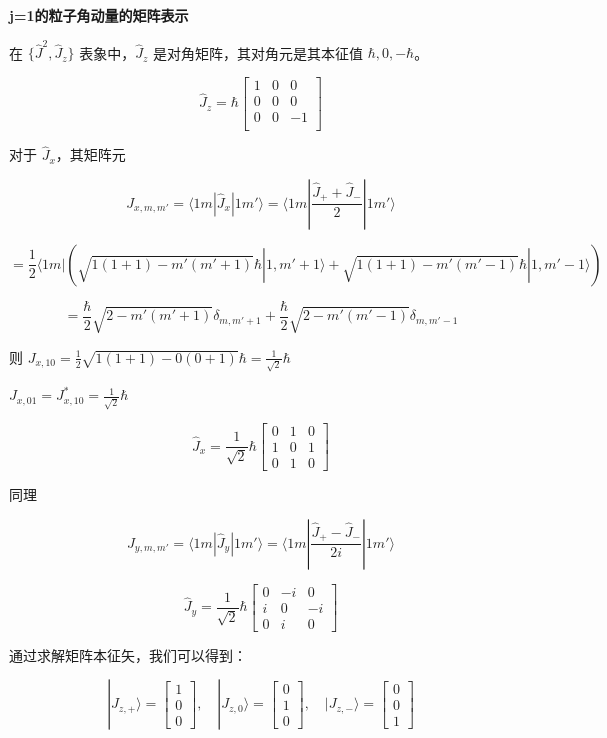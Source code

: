 \documentclass[lang=cn,10pt]{elegantbook}
\begin{document}
\textbf{j=1的粒子角动量的矩阵表示}

在 \(\{\hat{J}^2, \hat{J}_z\}\) 表象中，\(\hat{J}_z\) 是对角矩阵，其对角元是其本征值 \(\hbar, 0, -\hbar\)。

\[
\hat{J}_z = \hbar \begin{bmatrix}
1 & 0 & 0 \\
0 & 0 & 0 \\
0 & 0 & -1 \\
\end{bmatrix}
\]

对于 \(\hat{J}_x\)，其矩阵元

\[
J_{x, m, m'} = \langle 1 m | \hat{J}_x | 1 m' \rangle = \langle 1 m | \frac{\hat{J}_+ + \hat{J}_-}{2} | 1 m' \rangle
\]

\[
= \frac{1}{2} \langle 1 m | (\sqrt{1(1+1) - m'(m'+1)} \hbar | 1,m'+1 \rangle + \sqrt{1(1+1) - m'(m'-1)} \hbar | 1,m'-1 \rangle)
\]

\[
= \frac{\hbar}{2} \sqrt{2 - m'(m'+1)} \delta_{m, m'+1} + \frac{\hbar}{2} \sqrt{2 - m'(m'-1)} \delta_{m, m'-1}
\]

则 \(J_{x,10} = \frac{1}{2} \sqrt{1(1+1) - 0(0+1)} \hbar = \frac{1}{\sqrt{2}} \hbar\)

\(J_{x, 01} = J_{x, 10}^* = \frac{1}{\sqrt{2}} \hbar\)

\[
\hat{J}_x = \frac{1}{\sqrt{2}} \hbar \begin{bmatrix}
0 & 1 & 0 \\
1 & 0 & 1 \\
0 & 1 & 0
\end{bmatrix}
\]

同理

\[
J_{y, m, m'} = \langle 1 m | \hat{J}_y | 1 m' \rangle = \langle 1 m | \frac{\hat{J}_+ - \hat{J}_-}{2i} | 1 m' \rangle
\]

\[
\hat{J}_y = \frac{1}{\sqrt{2}} \hbar \begin{bmatrix}
0 & -i & 0 \\
i & 0 & -i \\
0 & i & 0
\end{bmatrix}
\]

通过求解矩阵本征矢，我们可以得到：

\[
|J_{z,+}\rangle = \begin{bmatrix} 1 \\ 0 \\ 0 \end{bmatrix}, \quad |J_{z,0}\rangle = \begin{bmatrix} 0 \\ 1 \\ 0 \end{bmatrix}, \quad |J_{z,-}\rangle = \begin{bmatrix} 0 \\ 0 \\ 1 \end{bmatrix}
\]
\end{document}
